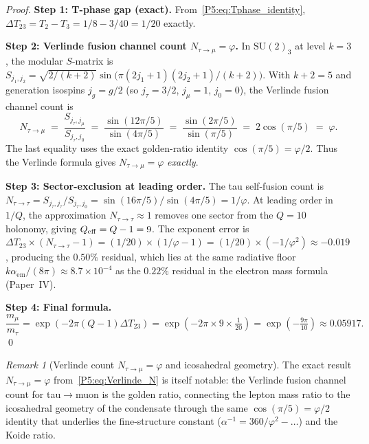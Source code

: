\documentclass[11pt,a4paper]{article}
\theoremstyle{definition}
\theoremstyle{remark}
\newtheorem{remark}[theorem]{Remark}
\newcommand{\vp}{\varphi}
\newcommand{\aem}{\alpha_{\mathrm{em}}}
\begin{document}
\begin{proof}
\textbf{Step 1: T-phase gap (exact).}
From~\eqref{P5:eq:Tphase_identity}, $\Delta T_{23}=T_2-T_3=1/8-3/40=1/20$ exactly.

\textbf{Step 2: Verlinde fusion channel count $N_{\tau\to\mu}=\vp$.}
In $\mathrm{SU}(2)_3$ at level $k=3$, the modular $S$-matrix is
$S_{j_1,j_2}=\sqrt{2/(k+2)}\sin\!\bigl(\pi(2j_1+1)(2j_2+1)/(k+2)\bigr)$.
With $k+2=5$ and generation isospins $j_g=g/2$ (so $j_\tau=3/2$,
$j_\mu=1$, $j_0=0$), the Verlinde fusion channel count is
\begin{equation}
  N_{\tau\to\mu}
  \;=\; \frac{S_{j_\tau,j_\mu}}{S_{j_\tau,j_0}}
  \;=\; \frac{\sin(12\pi/5)}{\sin(4\pi/5)}
  \;=\; \frac{\sin(2\pi/5)}{\sin(\pi/5)}
  \;=\; 2\cos(\pi/5)
  \;=\; \vp.
  \label{P5:eq:Verlinde_N}
\end{equation}
The last equality uses the exact golden-ratio identity $\cos(\pi/5)=\vp/2$.
Thus the Verlinde formula gives $N_{\tau\to\mu}=\vp$ \emph{exactly}.

\textbf{Step 3: Sector-exclusion at leading order.}
The tau self-fusion count is $N_{\tau\to\tau}=S_{j_\tau,j_\tau}/S_{j_\tau,j_0}
=\sin(16\pi/5)/\sin(4\pi/5)=1/\vp$.
At leading order in $1/Q$, the approximation $N_{\tau\to\tau}\approx1$
removes one sector from the $Q=10$ holonomy, giving
$Q_{\rm eff}=Q-1=9$.
The exponent error is $\Delta T_{23}\times(N_{\tau\to\tau}-1)=
(1/20)\times(1/\vp-1)=(1/20)\times(-1/\vp^2)\approx-0.019$,
producing the $0.50\%$ residual, which lies at the same radiative
floor $k\aem/(8\pi)\approx8.7\times10^{-4}$ as the $0.22\%$ residual
in the electron mass formula (Paper~IV).

\textbf{Step 4: Final formula.}
\[
  \frac{m_\mu}{m_\tau}
  =\exp(-2\pi(Q-1)\Delta T_{23})
  =\exp(-2\pi\times9\times\tfrac{1}{20})
  =\exp(-\tfrac{9\pi}{10})\approx0.05917.
\]
\qed
\end{proof}

\begin{remark}[Verlinde count $N_{\tau\to\mu}=\vp$ and icosahedral geometry]
\label{P5:rem:verlinde_phi}
The exact result $N_{\tau\to\mu}=\vp$ from~\eqref{P5:eq:Verlinde_N}
is itself notable: the Verlinde fusion channel count for tau$\to$muon
is the golden ratio, connecting the lepton mass ratio to the
icosahedral geometry of the condensate through the same
$\cos(\pi/5)=\vp/2$ identity that underlies the fine-structure
constant ($\alpha^{-1}=360/\vp^2-\ldots$) and the Koide ratio.
\end{remark}
\end{document}
